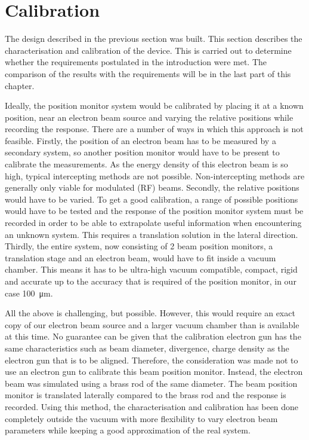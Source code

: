 \chapter{Calibration}
\label{sec:calibration}
The design described in the previous section was built. This section describes the characterisation and calibration of the device. This is carried out to determine whether the requirements postulated in the introduction were met. The comparison of the results with the requirements will be in the last part of this chapter.

Ideally, the position monitor system would be calibrated by placing it at a known position, near an electron beam source and varying the relative positions while recording the response. There are a number of ways in which this approach is not feasible. 
Firstly, the position of an electron beam has to be measured by a secondary system, so another position monitor would have to be present to calibrate the measurements. As the energy density of this electron beam is so high, typical intercepting methods are not possible. Non-intercepting methods are generally only viable for modulated (RF) beams. 
Secondly, the relative positions would have to be varied. To get a good calibration, a range of possible positions would have to be tested and the response of the position monitor system must be recorded in order to be able to extrapolate useful information when encountering an unknown system. This requires a translation solution in the lateral direction. Thirdly, the entire system, now consisting of 2 beam position monitors, a translation stage and an electron beam, would have to fit inside a vacuum chamber. This means it has to be ultra-high vacuum compatible, compact, rigid and accurate up to the accuracy that is required of the position monitor, in our case \SI{100}{\micro\meter}.

All the above is challenging, but possible. However, this would require an exact copy of our electron beam source and a larger vacuum chamber than is available at this time. 
No guarantee can be given that the calibration electron gun has the same characteristics such as beam diameter, divergence, charge density as the electron gun that is to be aligned.
Therefore, the consideration was made not to use an electron gun to calibrate this beam position monitor. Instead, the electron beam was simulated using a brass rod of the same diameter. 
The beam position monitor is translated laterally compared to the brass rod and the response is recorded. Using this method, the characterisation and calibration has been done completely outside the vacuum with more flexibility to vary electron beam parameters while keeping a good approximation of the real system. 

